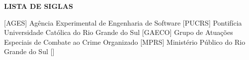 
\begin{center}
  \uppercase{\bfseries lista de siglas}\\[3em]
\end{center}

\begin{acronym}[XXXXXXXX]
   [AGES] {Agência Experimental de Engenharia de Software}
   [PUCRS] {Pontifícia Universidade Católica do Rio Grande do Sul}
   [GAECO] {Grupo de Atuações Especiais de Combate ao Crime Organizado}
   [MPRS] {Ministério Público do Rio Grande do Sul}
  \acro{} [] {}
\end{acronym}